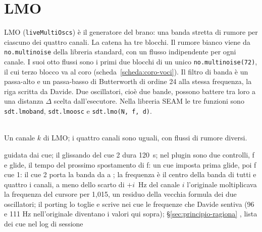 \chapter{LMO}\label{cap:lmo}
LMO (\texttt{liveMultiOscs}) è il generatore del brano: una banda stretta di rumore per ciascuno dei quattro canali.
La catena ha tre blocchi.
Il rumore bianco viene da \texttt{no.multinoise} della libreria standard, con un flusso indipendente per ogni canale.
I suoi otto flussi sono i primi due blocchi di un unico \texttt{no.multinoise(72)}, il cui terzo blocco va al coro (scheda~\ref{scheda:coro-voci}).
Il filtro di banda è un passa-alto e un passa-basso di Butterworth di ordine 24 alla stessa frequenza, la riga scritta da Davide.
Due oscillatori, cioè due bande, possono battere tra loro a una distanza $\Delta$ scelta dall'esecutore.
Nella libreria SEAM le tre funzioni sono \texttt{sdt.lmoband}, \texttt{sdt.lmoosc} e \texttt{sdt.lmo(N, f, d)}.

\begin{center}
\\[1mm]
{\small Un canale $k$ di LMO; i quattro canali sono uguali, con flussi di rumore diversi.}
\end{center}

{guidata dai cue; il glissando del cue 2 dura \qty{120}{\second}; nel plugin sono due controlli, f e glide, il tempo del prossimo spostamento di f: un cue imposta prima glide, poi f}
{cue 1: }
{il cue 2 porta la banda da  a ; la frequenza è il centro della banda di tutti e quattro i canali, a meno dello scarto di $+i$~Hz del canale $i$}
{l'originale moltiplicava la frequenza del cursore per 1,015, un residuo della vecchia formula dei due oscillatori; il porting lo toglie e scrive nei cue le frequenze che Davide sentiva (96 e 111 Hz nell'originale diventano i valori qui sopra); \S\ref{sec:principio-ragiona}}
{\deciso}
{, lista dei cue nel log di sessione}

